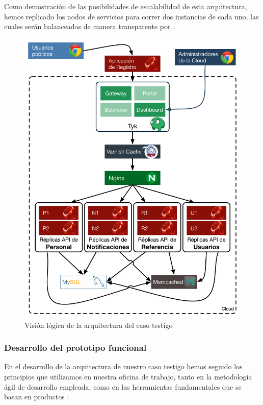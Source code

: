 Como demostración de las posibilidades de escalabilidad de esta arquitectura, hemos replicado los nodos de servicios para correr dos instancias de cada uno, las cuales serán balanceadas de manera transparente por .

\begin{figure}[H]
  \includegraphics[width=\linewidth]{src/images/05-capitulo-5/caso-testigo.png}
  \caption{Visión lógica de la arquitectura del caso testigo}
  \label{fig:arquitectura-caso-testigo}
\end{figure}

\subsubsection{Desarrollo del prototipo funcional}

En el desarrollo de la arquitectura de nuestro caso testigo hemos seguido los principios que utilizamos en nuestra oficina de trabajo, tanto en la metodología ágil de desarrollo empleada, como en las herramientas fundamentales que se basan en productos :

